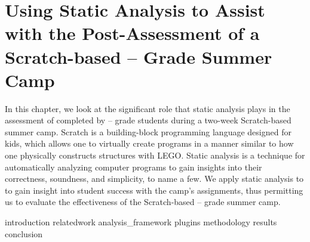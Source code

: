 \chapter{Using Static Analysis to Assist with the Post-Assessment of a
  Scratch-based -- Grade Summer Camp}
\label{chap:hairball}

\def\currentprefix{hairball}

In this chapter, we look at the significant role that static analysis plays in
the assessment of  completed by -- grade students
during a two-week Scratch-based summer camp. Scratch is a building-block
programming language designed for kids, which allows one to virtually create
programs in a manner similar to how one physically constructs structures with
LEGO\textregistered{}. Static analysis is a technique for automatically
analyzing computer programs to gain insights into their correctness, soundness,
and simplicity, to name a few. We apply static analysis to  to gain
insight into student success with the camp's assignments, thus permitting us to
evaluate the effectiveness of the Scratch-based -- grade summer
camp.

{introduction}
{relatedwork}
{analysis_framework}
{plugins}
{methodology}
{results}
{conclusion}
